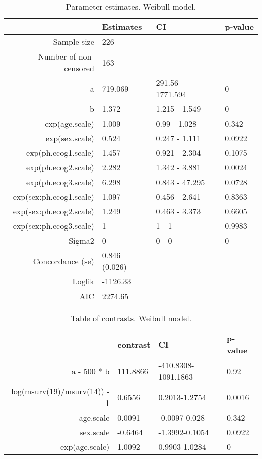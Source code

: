 \documentclass[A4document,12pt]{article}\usepackage[]{graphicx}\usepackage[]{color}
\begin{document}
\begin{table}[ht]
\centering
\begin{tabular}{rlll}
  \hline
 & Estimates & CI & p-value \\ 
  \hline
Sample size & 226 &  &  \\ 
  Number of non-censored & 163 &  &  \\ 
  a   & 719.069 & 291.56 - 1771.594 & 0 \\ 
  b & 1.372 & 1.215 - 1.549 & 0 \\ 
  exp(age.scale) & 1.009 & 0.99 - 1.028 & 0.342 \\ 
  exp(sex.scale) & 0.524 & 0.247 - 1.111 & 0.0922 \\ 
  exp(ph.ecog1.scale) & 1.457 & 0.921 - 2.304 & 0.1075 \\ 
  exp(ph.ecog2.scale) & 2.282 & 1.342 - 3.881 & 0.0024 \\ 
  exp(ph.ecog3.scale) & 6.298 & 0.843 - 47.295 & 0.0728 \\ 
  exp(sex:ph.ecog1.scale) & 1.097 & 0.456 - 2.641 & 0.8363 \\ 
  exp(sex:ph.ecog2.scale) & 1.249 & 0.463 - 3.373 & 0.6605 \\ 
  exp(sex:ph.ecog3.scale) & 1 & 1 - 1 & 0.9983 \\ 
  Sigma2 & 0 & 0 - 0 & 0 \\ 
  Concordance (se) & 0.846 (0.026) &  &  \\ 
  Loglik & -1126.33 &  &  \\ 
  AIC & 2274.65 &  &  \\ 
   \hline
\end{tabular}
\caption{Parameter estimates. Weibull model.} 
\end{table}
\begin{table}[ht]
\centering
\begin{tabular}{rlll}
  \hline
 & contrast & CI & p-value \\ 
  \hline
a - 500 * b & 111.8866 & -410.8308-1091.1863 & 0.92 \\ 
  log(msurv(19)/msurv(14)) - 1 & 0.6556 & 0.2013-1.2754 & 0.0016 \\ 
  age.scale & 0.0091 & -0.0097-0.028 & 0.342 \\ 
  sex.scale & -0.6464 & -1.3992-0.1054 & 0.0922 \\ 
  exp(age.scale) & 1.0092 & 0.9903-1.0284 & 0 \\ 
   \hline
\end{tabular}
\caption{Table of contrasts. Weibull model.} 
\end{table}
\end{document}
